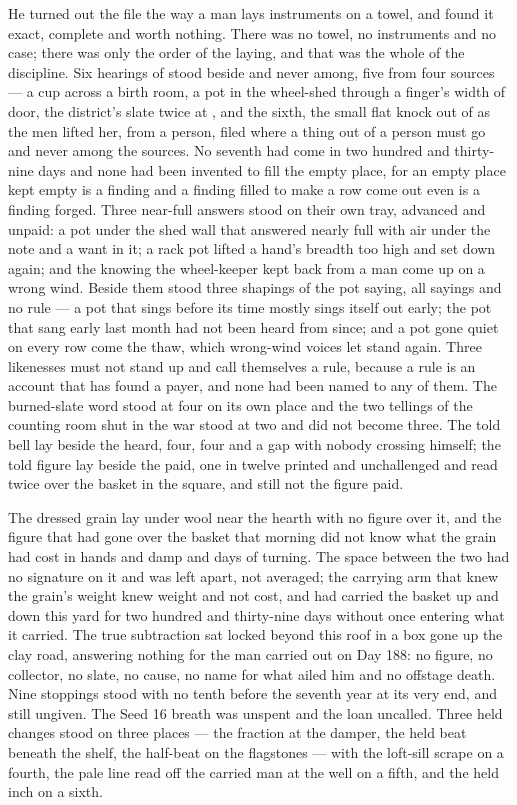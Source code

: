 He turned out the file the way a man lays instruments on a towel, and found it exact, complete and worth nothing. There was no towel, no instruments and no case; there was only the order of the laying, and that was the whole of the discipline. Six hearings of  stood beside and never among, five from four sources --- a cup across a birth room, a pot in the wheel-shed through a finger's width of door, the district's slate twice at , and the sixth, the small flat knock out of  as the men lifted her, from a person, filed where a thing out of a person must go and never among the sources. No seventh had come in two hundred and thirty-nine days and none had been invented to fill the empty place, for an empty place kept empty is a finding and a finding filled to make a row come out even is a finding forged. Three near-full answers stood on their own tray, advanced and unpaid: a pot under the shed wall that answered nearly full with air under the note and a want in it; a rack pot lifted a hand's breadth too high and set down again; and the knowing the wheel-keeper kept back from a man come up on a wrong wind. Beside them stood three shapings of the pot saying, all sayings and no rule --- a pot that sings before its time mostly sings itself out early; the pot that sang early last month had not been heard from since; and a pot gone quiet on every row come the thaw, which wrong-wind voices let stand again. Three likenesses must not stand up and call themselves a rule, because a rule is an account that has found a payer, and none had been named to any of them. The burned-slate word stood at four on its own place and the two tellings of the counting room shut in the war stood at two and did not become three. The told bell lay beside the heard, four, four and a gap with nobody crossing himself; the told figure lay beside the paid, one in twelve printed and unchallenged and read twice over the basket in the square, and still not the figure paid.

The dressed grain lay under wool near the hearth with no figure over it, and the figure that had gone over the basket that morning did not know what the grain had cost in hands and damp and days of turning. The space between the two had no signature on it and was left apart, not averaged; the carrying arm that knew the grain's weight knew weight and not cost, and had carried the basket up and down this yard for two hundred and thirty-nine days without once entering what it carried. The true subtraction sat locked beyond this roof in a box gone up the clay road, answering nothing for the man carried out on Day 188: no figure, no collector, no slate, no cause, no name for what ailed him and no offstage death. Nine stoppings stood with no tenth before the seventh year at its very end, and still ungiven. The Seed 16 breath was unspent and the loan uncalled. Three held changes stood on three places --- the fraction at the damper, the held beat beneath the shelf, the half-beat on the flagstones --- with the loft-sill scrape on a fourth, the pale line read off the carried man at the well on a fifth, and the held inch on a sixth.

